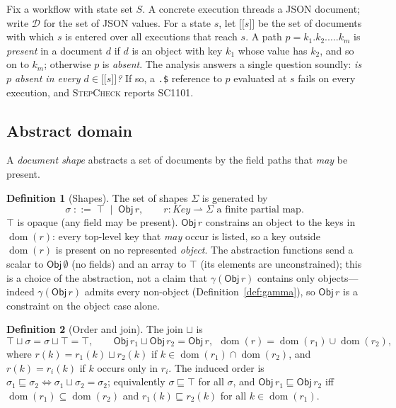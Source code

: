 \documentclass[11pt]{article}
\newcommand{\code}[1]{\textsf{\small #1}}
\newcommand{\tool}{\textsc{StepCheck}}
\newcommand{\dom}{\operatorname{dom}}
\newcommand{\Obj}{\mathsf{Obj}}
\providecommand{\llbracket}{\mathopen{[\![}}
\providecommand{\rrbracket}{\mathclose{]\!]}}
\theoremstyle{plain}
\theoremstyle{definition}
\newtheorem{definition}{Definition}
\theoremstyle{remark}
\begin{document}
Fix a workflow with state set $S$. A concrete execution threads a JSON document; write
$\mathcal{D}$ for the set of JSON values. For a state $s$, let $\llbracket s\rrbracket$ be the
set of documents with which $s$ is entered over all executions that reach $s$. A path
$p=k_1.k_2.\dots.k_m$ is \emph{present} in a document $d$ if $d$ is an object with key $k_1$
whose value has $k_2$, and so on to $k_m$; otherwise $p$ is \emph{absent}. The analysis
answers a single question soundly: \emph{is $p$ absent in every $d\in\llbracket s\rrbracket$?}
If so, a \texttt{.\$} reference to $p$ evaluated at $s$ fails on every execution, and \tool{}
reports \code{SC1101}.

\subsection{Abstract domain}

A \emph{document shape} abstracts a set of documents by the field paths that \emph{may} be
present.

\begin{definition}[Shapes]
The set of shapes $\Sigma$ is generated by
\[
  \sigma \;::=\; \top \;\mid\; \Obj\,r, \qquad r : \mathit{Key}\rightharpoonup\Sigma
  \text{ a finite partial map.}
\]
$\top$ is opaque (any field may be present). $\Obj\,r$ constrains an object to the keys in
$\dom(r)$: every top-level key that \emph{may} occur is listed, so a key outside $\dom(r)$ is
present on no represented \emph{object}. The abstraction functions send a scalar to
$\Obj\,\emptyset$ (no fields) and an array to $\top$ (its elements are unconstrained); this is
a choice of the abstraction, not a claim that $\gamma(\Obj\,r)$ contains only objects---indeed
$\gamma(\Obj\,r)$ admits every non-object (Definition~\ref{def:gamma}), so $\Obj\,r$ is a
constraint on the object case alone.
\end{definition}

\begin{definition}[Order and join]
The join $\sqcup$ is
\[
  \top\sqcup\sigma=\sigma\sqcup\top=\top,\qquad
  \Obj\,r_1 \sqcup \Obj\,r_2 = \Obj\,r,\ \
  \dom(r)=\dom(r_1)\cup\dom(r_2),
\]
where $r(k)=r_1(k)\sqcup r_2(k)$ if $k\in\dom(r_1)\cap\dom(r_2)$, and $r(k)=r_i(k)$ if $k$
occurs only in $r_i$. The induced order is $\sigma_1\sqsubseteq\sigma_2 \iff
\sigma_1\sqcup\sigma_2=\sigma_2$; equivalently $\sigma\sqsubseteq\top$ for all $\sigma$, and
$\Obj\,r_1\sqsubseteq\Obj\,r_2$ iff $\dom(r_1)\subseteq\dom(r_2)$ and
$r_1(k)\sqsubseteq r_2(k)$ for all $k\in\dom(r_1)$.
\end{definition}
\end{document}
